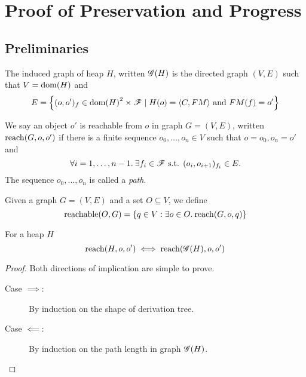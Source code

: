 \chapter{Proof of Preservation and Progress}
\label{cha:proof_of_pnp}

\section{Preliminaries}%
\label{sec:preliminaries}

\begin{definition}
  The induced graph of heap $H$, written $\mathscr{G}{(H)}$ is the directed graph
  $(V, E)$ such that $V = \mbox{$\mathrm{dom}$}{(H)}$ and 
  \begin{equation}
    E = \left\{ (o, o')_f \in \mbox{$\mathrm{dom}$}{(H)}^2 \times \mathscr{F} \mid
      H(o) = \mbox{$\langle C, FM \rangle$} \text{ and } FM(f) = o' \right\}
  \end{equation}
\end{definition}

\begin{definition}
  We say an object $o'$ is reachable from $o$ in graph $G = (V,
  E)$, written $\mbox{$\mathrm{reach}$}{(G, o, o')}$ if there is a finite sequence $o_0, \dots,
  o_n \in V$ such that $o = o_0, o_n = o'$ and
  \begin{equation}
    \forall i = 1,\dots, n-1. \: \exists f_i \in \mathscr{F} \text{ s.t. } (o_i,
    o_{i+1})_{f_i} \in E.
  \end{equation}
  The sequence $o_0, \dots, o_n$ is called a \emph{path}.
\end{definition}

\begin{definition}
  Given a graph $G = (V, E)$ and a set $O \subseteq V$, we define
  \begin{equation}
    \mbox{$\mathrm{reachable}$}{(O, G)} = \left\{ q \in V: \exists o\in O.\: \mbox{$\mathrm{reach}$}{(G, o, q)}
    \right\} \notag
  \end{equation}
\end{definition}

\begin{proposition}
  \label{prop:reacheq}
  For a heap $H$ 
  \begin{equation}
    \mbox{$\mathrm{reach}$}{(H, o, o')} \iff \mbox{$\mathrm{reach}$}{(\ensuremath{\mathscr{G}}{(H)}, o, o')}
  \end{equation}
\end{proposition}

\begin{proof}
  Both directions of implication are simple to prove.
  \begin{description}
    \item[Case $\implies$:] By induction on the shape of derivation tree.
    \item[Case $\impliedby$:] By induction on the path length in graph
      $\mathscr{G}{(H)}$.
  \end{description}
\end{proof}

